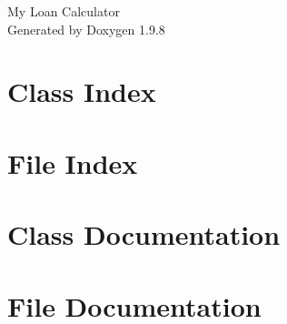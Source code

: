\documentclass[twoside]{book}
\newcommand{\+}{\discretionary{\mbox{\scriptsize$\hookleftarrow$}}{}{}}
\newcommand{\clearemptydoublepage}{%
    \newpage{\pagestyle{empty}\cleardoublepage}%
  }
\begin{document}
  \raggedbottom
    \hypersetup{pageanchor=false,
                bookmarksnumbered=true,
                pdfencoding=unicode
               }
  \begin{titlepage}
  \vspace*{7cm}
  \begin{center}%
  {\Large My Loan Calculator}\\
  \vspace*{1cm}
  {\large Generated by Doxygen 1.9.8}\\
  \end{center}
  \end{titlepage}
  \clearemptydoublepage
  \tableofcontents
  \clearemptydoublepage
  \hypersetup{pageanchor=true}
\chapter{Class Index}

\chapter{File Index}

\chapter{Class Documentation}

\chapter{File Documentation}

  \backmatter
  \newpage
  \clearemptydoublepage
  \printindex
\end{document}
